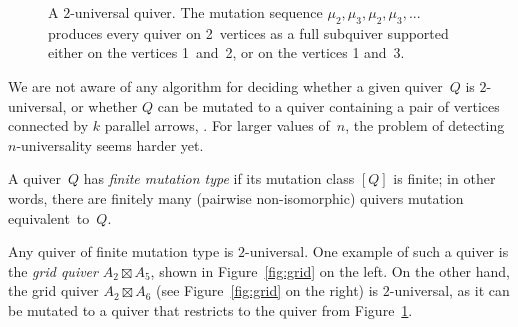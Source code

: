 \documentclass[ALCO,ThmDefs,Unicode,epreuves,published]{cedram}
\begin{document}
\begin{figure}[ht]\centering
{}

\caption{A $2$-universal quiver. The mutation sequence $\mu_2,\mu_3,\mu_2,\mu_3,...$ produces every quiver on 2~vertices as a full subquiver supported either on the vertices 1~and~2, or on the vertices 1 and~3.}\label{fig:2-universal-quiver}
\end{figure}

\begin{remark}
We are not aware of any algorithm for deciding whether a given quiver~$Q$ is $2$-universal, or whether $Q$ can be mutated to a quiver containing a pair of vertices connected by $k$ parallel arrows, \cf \cite[Remark~4.1.13]{FWZ}. For larger values of~$n$, the problem of detecting $n$-universality seems harder yet. 
\end{remark}

A quiver~$Q$ has \emph{finite mutation type} if its mutation class $[Q]$ is finite; in other words, there are finitely many (pairwise non-isomorphic) quivers mutation equivalent~to~$Q$. 

\begin{example}
\label{example:grid-quivers}
Any quiver of finite mutation type is  $2$-universal. One example of such a quiver is the \emph{grid quiver} $A_2\boxtimes A_5$, shown in Figure~\ref{fig:grid} on the left. On the other hand, the grid quiver $A_2\boxtimes A_6$ (see Figure~\ref{fig:grid} on the right) is $2$-universal, as it can be mutated to a quiver that restricts to the quiver from Figure~\ref{fig:2-universal-quiver}. 
\end{example}
\end{document}
